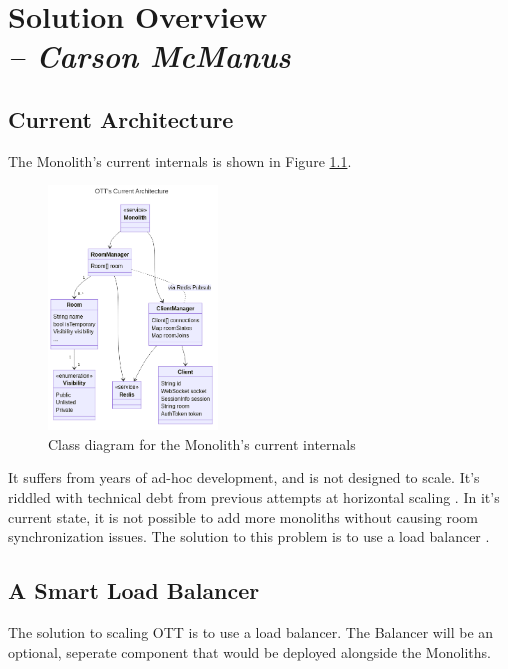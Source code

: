 \chapter{Solution Overview \\
  \small{\textit{-- Carson McManus}}
  \label{Chapter::SolutionOverview}}

\section{Current Architecture}

The Monolith's  current internals is shown in Figure \ref{fig:monolith-class-current}.

\begin{figure}[!h]
  \centering
  \includegraphics[width=0.4\textwidth]{Figures/monolith-class-current.png}
  \caption{Class diagram for the Monolith's current internals}
  \label{fig:monolith-class-current}
\end{figure}

It suffers from years of ad-hoc development, and is not designed to scale. It's riddled with technical debt from previous attempts at horizontal scaling . In it's current state, it is not possible to add more monoliths without causing room synchronization issues. The solution to this problem is to use a load balancer .

\section{A Smart Load Balancer}

The solution to scaling OTT is to use a load balancer. The Balancer will be an optional, seperate component that would be deployed alongside the Monoliths.

